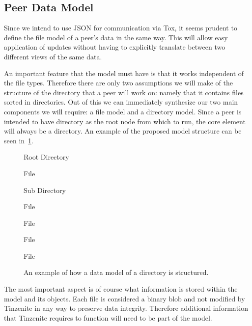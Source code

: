 \subsection{Peer Data Model}


Since we intend to use JSON for communication via Tox, it seems prudent to define the file model of a peer's data in the same way.
This will allow easy application of updates without having to explicitly translate between two different views of the same data.

An important feature that the model must have is that it works independent of the file types.
Therefore there are only two assumptions we will make of the structure of the directory that a peer will work on: namely that it contains files sorted in directories.
Out of this we can immediately synthesize our two main components we will require: a file model and a directory model.
Since a peer is intended to have directory as the root node from which to run, the core element will always be a directory.
An example of the proposed model structure can be seen in~\ref{list:model}.

\begin{figure}[htp]
\begin{modellist}
\item Root Directory
    \begin{modellist}
        \item File
        \item Sub Directory
            \begin{modellist}
                \item File
                \item File
            \end{modellist}
        \item File
        \item File
    \end{modellist}
\end{modellist}
\caption[Data Model Example Structure]{An example of how a data model of a directory is structured.}
\label{list:model}
\end{figure}

The most important aspect is of course what information is stored within the model and its objects.
Each file is considered a binary blob and not modified by Tinzenite in any way to preserve data integrity.
Therefore additional information that Tinzenite requires to function will need to be part of the model.

